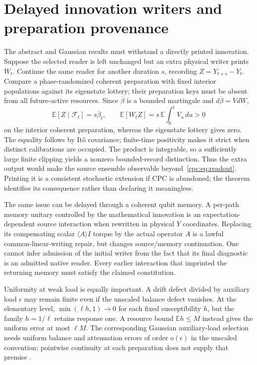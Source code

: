 \documentclass[11pt,oneside,openany]{book}
\theoremstyle{definition}
\theoremstyle{remark}\newtheorem{remark}[theorem]{Remark}
\begin{document}
\section{Delayed innovation writers and preparation provenance}

The abstract and Gaussian results must withstand a directly printed innovation. Suppose the selected reader is left unchanged but an extra physical writer prints $W_t$. Continue the same reader for another duration $s$, recording $Z=Y_{t+s}-Y_t$. Compare a phase-randomized coherent preparation with fixed interior populations against its eigenstate lottery; their preparation keys must be absent from all future-active resources. Since $\overline\beta$ is a bounded martingale and $d\overline\beta=VdW$,
\begin{equation}
 \mathbb E[Z\mid\mathcal F_t]=s\overline\beta_t,\qquad
 \mathbb E[W_tZ]=s\,\mathbb E\int_0^t V_u\,du>0
 \label{cpc:eq:innovationwitness}
\end{equation}
on the interior coherent preparation, whereas the eigenstate lottery gives zero. The equality follows by It\^o covariance; finite-time positivity makes it strict when distinct calibrations are occupied. The product is integrable, so a sufficiently large finite clipping yields a nonzero bounded-record distinction. Thus the extra output would make the source ensemble observable beyond~\eqref{cpc:eq:readout}. Printing it is a consistent stochastic extension if CPC is abandoned; the theorem identifies its consequence rather than declaring it meaningless.

The same issue can be delayed through a coherent qubit memory. A per-path memory unitary controlled by the mathematical innovation is an expectation-dependent source interaction when rewritten in physical $Y$ coordinates. Replacing its compensating scalar $\langle A\rangle I$ torque by the actual operator $A$ is a lawful common-linear-writing repair, but changes source/memory continuation. One cannot infer admission of the initial writer from the fact that its final diagnostic is an admitted native reader. Every earlier interaction that imprinted the returning memory must satisfy the claimed constitution.

Uniformity at weak load is equally important. A drift defect divided by auxiliary load $\epsilon$ may remain finite even if the unscaled balance defect vanishes. At the elementary level, $\min(\ell h,1)\to0$ for each fixed susceptibility $h$, but the family $h=1/\ell$ retains response one. A resource bound $\mathbb E h\le M$ instead gives the uniform error at most $\ell M$. The corresponding Gaussian auxiliary-load selection needs uniform balance and attenuation errors of order $o(\epsilon)$ in the unscaled convention; pointwise continuity at each preparation does not supply that premise \cite{M08,M09}.
\end{document}
